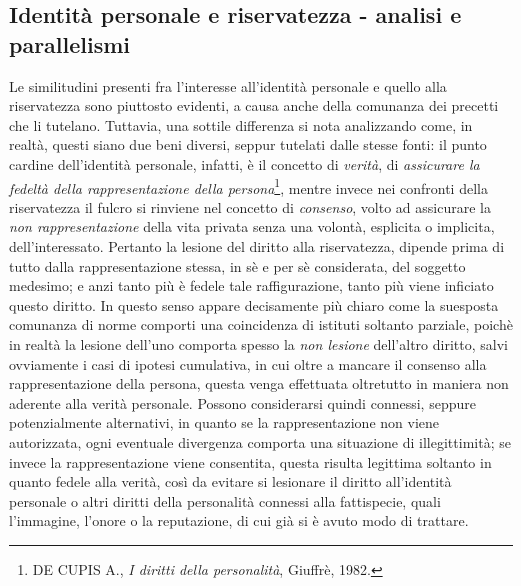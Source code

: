 \subsection{Identità personale e riservatezza - analisi e parallelismi}%
Le similitudini presenti fra l'interesse all'identità personale e quello alla riservatezza sono piuttosto evidenti, a causa anche della comunanza dei precetti che li tutelano. Tuttavia, una sottile differenza si nota analizzando come, in realtà, questi siano due beni diversi, seppur tutelati dalle stesse fonti: il punto cardine dell'identità personale, infatti, è il concetto di \textit{verità}, di \textit{assicurare la fedeltà della rappresentazione della persona}\footnote{DE CUPIS A., \textit{I diritti della personalità}, Giuffrè, 1982.}, mentre invece nei confronti della riservatezza il fulcro si rinviene nel concetto di \textit{consenso}, volto ad assicurare la \textit{non rappresentazione} della vita privata senza una volontà, esplicita o implicita, dell'interessato. 
Pertanto la lesione del diritto alla riservatezza, dipende prima di tutto dalla rappresentazione stessa, in sè e per sè considerata, del soggetto medesimo; e anzi tanto più è fedele tale raffigurazione, tanto più viene inficiato questo diritto. In questo senso appare decisamente più chiaro come la suesposta comunanza di norme comporti una coincidenza di istituti soltanto parziale, poichè in realtà la lesione dell'uno comporta spesso la \textit{non lesione} dell'altro diritto, salvi ovviamente i casi di ipotesi cumulativa, in cui oltre a mancare il consenso alla rappresentazione della persona, questa venga effettuata oltretutto in maniera non aderente alla verità personale. Possono considerarsi quindi connessi, seppure potenzialmente alternativi, in quanto se la rappresentazione non viene autorizzata, ogni eventuale divergenza comporta una situazione di illegittimità; se invece la rappresentazione viene consentita, questa risulta legittima soltanto in quanto fedele alla verità, così da evitare si lesionare il diritto all'identità personale o altri diritti della personalità connessi alla fattispecie,  quali l'immagine, l'onore o la reputazione, di cui già si è avuto modo di trattare.

